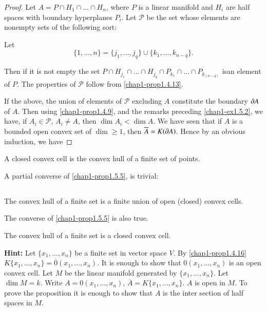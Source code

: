 \begin{proof}
Let $A=P\cap H_{1}\cap \ldots\cap H_{n}$, where $P$ is a linear manifold and $H_{i}$ are half spaces with boundary hyperplanes $P_{i}$. Let $\mathscr{P}$ be the set whose elements are nonempty sets of the following sort:

Let
$$
\{1,\ldots,n\}=\{j_{1},\ldots,j_{q}\}\cup \{k_{1},\ldots,k_{n-q}\}.
$$

Then if it is not empty the set $P\cap H_{j_{1}}\cap\ldots\cap H_{j_{q}}\cap P_{k_{1}}\cap\ldots\cap P_{k_{(n-q)}}$ is\pageoriginale an element of $P$. The properties of $\mathscr{P}$ follow from \ref{chap1-prop1.4.13}.

If the above, the union of elements of $\mathscr{P}$ excluding $A$ constitute the boundary $\partial A$ of $A$. Then using \ref{chap1-prop1.4.9}, and the remarks preceding \ref{chap1-ex1.5.2}, we have, if $A_{i}\in \mathscr{P}$, $A_{i}\neq A$, then $\dim A_{i}<\dim A$. We have seen that if $A$ is a bounded open convex set of $\dim \geq 1$, then $\overline{A}=K(\partial A)$. Hence by an obvious induction, we have 
\end{proof}

\begin{proposition}\label{chap1-prop1.5.5}
A closed convex cell is the convex hull of a finite set of points.
\end{proposition}

A partial converse of \ref{chap1-prop1.5.5}, is trivial:

\setcounter{subsection}{5}
\subsection{}\label{chap1-sec1.5.6}
The convex hull of a finite set is a finite union of open (closed) convex cells.

The converse of \ref{chap1-prop1.5.5} is also true.

\setcounter{proposition}{6}
\begin{ex}\label{chap1-ex1.5.7}
The convex hull of a finite set is a closed convex cell.
\end{ex}

\noindent
{\bf Hint:} Let $\{x_{1},\ldots,x_{n}\}$ be a finite set in vector space $V$. By 
\ref{chap1-prop1.4.16} $K\{x_{1},\ldots,x_{n}\}=\overline{0}(x_{1},\ldots,x_{n})$. It is enough to show that $0(x_{1},\ldots,x_{n})$ is an open convex cell. Let $M$ be the linear manifold generated by $\{x_{1},\ldots,x_{n}\}$. Let $\dim M=k$. Write $A=0(x_{1},\ldots,x_{n})$, $\overline{A}=K\{x_{1},\ldots,x_{n}\}$. $A$ is open in $M$. To prove the proposition it is enough to show that $A$ is the inter section of half spaces in $M$.

